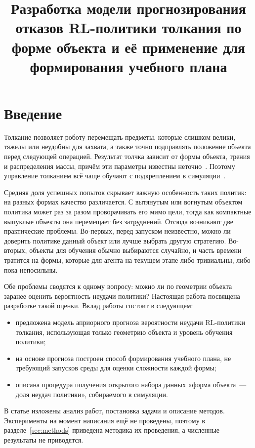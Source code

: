 \documentclass{misisarticle}
\title{Разработка модели прогнозирования отказов RL-политики толкания по форме объекта и её применение для формирования учебного плана}
\begin{document}
\maketitle

\section{Введение}

Толкание позволяет роботу перемещать предметы, которые слишком велики, тяжелы или неудобны для захвата, а также точно подправлять положение объекта перед следующей операцией. Результат толчка зависит от формы объекта, трения и распределения массы, причём эти параметры известны неточно~\cite{mason1986, lynch1996}. Поэтому управление толканием всё чаще обучают с подкреплением в симуляции~\cite{li2018, cong2022}.

Средняя доля успешных попыток скрывает важную особенность таких политик: на разных формах качество различается. С вытянутым или вогнутым объектом политика может раз за разом проворачивать его мимо цели, тогда как компактные выпуклые объекты она перемещает без затруднений. Отсюда возникают две практические проблемы. Во-первых, перед запуском неизвестно, можно ли доверить политике данный объект или лучше выбрать другую стратегию. Во-вторых, объекты для обучения обычно выбираются случайно, и часть времени тратится на формы, которые для агента на текущем этапе либо тривиальны, либо пока непосильны.

Обе проблемы сводятся к одному вопросу: можно ли по геометрии объекта заранее оценить вероятность неудачи политики? Настоящая работа посвящена разработке такой оценки. Вклад работы состоит в следующем:
\begin{itemize}
  \item предложена модель априорного прогноза вероятности неудачи RL-политики толкания, использующая только геометрию объекта и уровень обучения политики;
  \item на основе прогноза построен способ формирования учебного плана, не требующий запусков среды для оценки сложности каждой формы;
  \item описана процедура получения открытого набора данных «форма объекта~--- доля неудач политики», собираемого в симуляции.
\end{itemize}

В статье изложены анализ работ, постановка задачи и описание методов. Эксперименты на момент написания ещё не проведены, поэтому в разделе~\ref{sec:methods} приведена методика их проведения, а численные результаты не приводятся.
\end{document}

